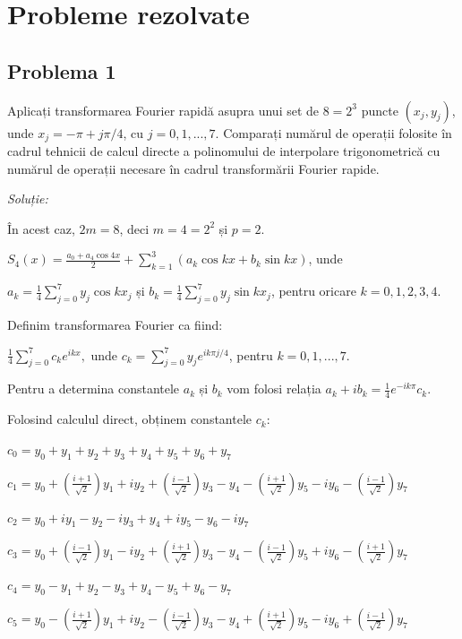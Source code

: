 \documentclass{exam}
\begin{document}
\section{Probleme rezolvate}

\subsection{Problema 1}
Aplicați transformarea Fourier rapidă asupra unui set de $8 = 2^3$ puncte $(x_j, y_j)$, unde $x_j = -\pi + j\pi/4$, cu $j = 0, 1, ..., 7$. Comparați numărul de operații folosite în cadrul tehnicii de calcul directe a polinomului de interpolare trigonometrică cu numărul de operații necesare în cadrul transformării Fourier rapide.

\textit{Soluție:}

În acest caz, $2m = 8$, deci $m = 4 = 2^2$ și $p = 2$.

$S_4(x) = \frac{a_0 + a_4\cos 4x}{2} + \sum_{k=1}^{3} (a_k\cos kx + b_k\sin kx)$, unde

$a_k = \frac{1}{4}\sum_{j=0}^{7} y_j\cos kx_j$ și $b_k = \frac{1}{4}\sum_{j=0}^{7} y_j\sin kx_j$, pentru oricare $k=0, 1, 2, 3, 4.$

Definim transformarea Fourier ca fiind:

$\frac{1}{4}\sum_{j=0}^{7} c_ke^{ikx},$
unde $c_k = \sum_{j=0}^{7} y_je^{ik\pi j/4}$, pentru $k = 0, 1, ..., 7$.

Pentru a determina constantele $a_k$ și $b_k$ vom folosi relația $a_k + ib_k = \frac{1}{4}e^{-ik\pi}c_k.$

Folosind calculul direct, obținem constantele $c_k$:

$c_0 = y_0 + y_1 + y_2 + y_3 + y_4 + y_5 + y_6 + y_7$

$c_1 = y_0 + (\frac{i+1}{\sqrt{2}})y_1 + iy_2 + (\frac{i-1}{\sqrt{2}})y_3 - y_4 - (\frac{i+1}{\sqrt{2}})y_5 - iy_6 - (\frac{i-1}{\sqrt{2}})y_7$

$c_2 = y_0 + iy_1 - y_2 - iy_3 + y_4 + iy_5 - y_6 - iy_7$

$c_3 = y_0 + (\frac{i-1}{\sqrt{2}})y_1 - iy_2 + (\frac{i+1}{\sqrt{2}})y_3 - y_4 - (\frac{i-1}{\sqrt{2}})y_5 + iy_6 - (\frac{i+1}{\sqrt{2}})y_7$

$c_4 = y_0 - y_1 + y_2 - y_3 + y_4 - y_5 + y_6 - y_7$

$c_5 = y_0 - (\frac{i+1}{\sqrt{2}})y_1 + iy_2 - (\frac{i-1}{\sqrt{2}})y_3 - y_4 + (\frac{i+1}{\sqrt{2}})y_5 - iy_6 + (\frac{i-1}{\sqrt{2}})y_7$
\end{document}
